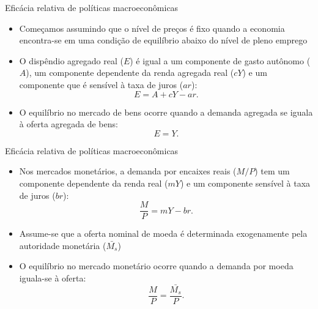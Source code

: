 \documentclass[10pt]{beamer}
\begin{document}
\begin{frame}{Eficácia relativa de políticas macroeconômicas}
    \begin{itemize}
        \item Começamos assumindo que o nível de preços é fixo quando a economia encontra-se em uma condição de equilíbrio abaixo do nível de pleno emprego
        \bigskip
        \item O dispêndio agregado real ($E$) é igual a um componente de gasto autônomo ($A$), um componente dependente da renda agregada real ($cY$) e um componente que é sensível à taxa de juros ($ar$):
        \begin{equation}
            E = A + cY - ar.
            \label{eq1}
        \end{equation}
        \bigskip
        \item O equilíbrio no mercado de bens ocorre quando a demanda agregada se iguala à oferta agregada de bens:
        \begin{equation}
            E = Y.
            \label{eq2}
        \end{equation}
    \end{itemize}
\end{frame}

\begin{frame}{Eficácia relativa de políticas macroeconômicas}
    \begin{itemize}
        \item Nos mercados monetários, a demanda por encaixes reais ($M/P$) tem um componente dependente da renda real ($mY$) e um componente sensível à taxa de juros ($br$):
        \begin{equation}
            \frac{M}{P} = mY - br.
            \label{eq3}
        \end{equation}
        \bigskip
        \item Assume-se que a oferta nominal de moeda é determinada exogenamente pela autoridade monetária ($\bar{M_s}$)
        \bigskip
        \item O equilíbrio no mercado monetário ocorre quando a demanda por moeda iguala-se à oferta:
        \begin{equation}
            \frac{M}{P} = \frac{\bar{M_s}}{P}.
            \label{eq4}
        \end{equation}
    \end{itemize}
\end{frame}
\end{document}
